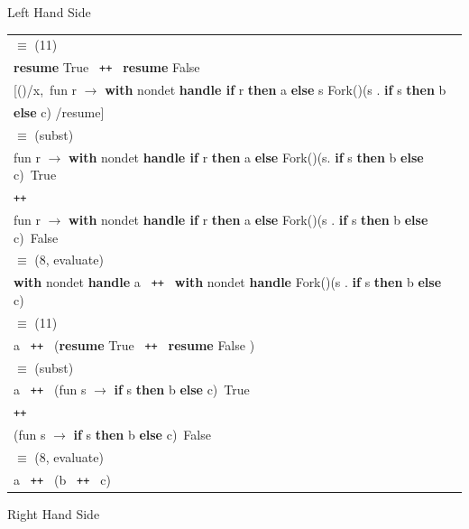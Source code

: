 \documentclass[logo,bsc,singlespacing,parskip]{infthesis}
\begin{document}
{Left Hand Side}
\begin{longtable}{@{}l@{}}
\quad$\equiv$ (11) \\
\textbf{resume } True \texttt{ ++ } \textbf{resume } False \\
\quad [()/x,\ fun r $\rightarrow$ \textbf{with } nondet \textbf{handle if }r\textbf{ then } a \textbf{ else } s
 Fork()(s . \textbf{if } s \textbf{ then } b \\ \quad \textbf{ else } c) /resume] \\

\quad$\equiv$ (subst) \\
fun r $\rightarrow$ \textbf{with } nondet \textbf{ handle if } r \textbf{ then } a \textbf{ else } Fork()(s. \textbf{if } s \textbf{ then } b \textbf{ else } c)\ True \\
\quad\texttt{++} \\
fun r $\rightarrow$ \textbf{with } nondet \textbf{ handle if } r \textbf{ then } a \textbf{ else } Fork()(s . \textbf{if } s \textbf{ then } b \textbf{ else } c)\ False \\

\quad$\equiv$ (8, evaluate) \\
\textbf{with } nondet \textbf{ handle } a \texttt{ ++ } \textbf{with } nondet \textbf{ handle } Fork()(s . \textbf{if } s \textbf{ then } b \textbf{ else } c) \\

\quad$\equiv$ (11) \\
a \texttt{ ++ } (\textbf{resume } True \texttt{ ++ } \textbf{resume } False 
) \\

\quad$\equiv$ (subst) \\
a \texttt{ ++ } (fun s $\rightarrow$ \textbf{if } s \textbf{ then } b \textbf{ else } c)\ True \\
\quad\texttt{++} \\
(fun s $\rightarrow$ \textbf{if } s \textbf{ then } b \textbf{ else } c)\ False \\

\quad$\equiv$ (8, evaluate) \\
a \texttt{ ++ } (b \texttt{ ++ } c) \\
\end{longtable}




{Right Hand Side}
\end{document}

